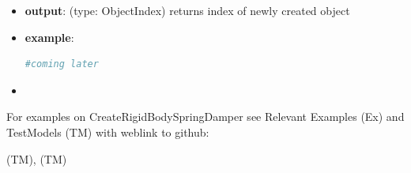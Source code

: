 \begin{itemize}[leftmargin=0.7cm]
\begin{itemize}[leftmargin=1.2cm]
\item[]{\it springForceTorqueUserFunction}: a user function springForceTorqueUserFunction(mbs, t, itemNumber, displacement, rotation, velocity, angularVelocity, stiffness, damping, rotJ0, rotJ1, offset)->[float,float,float, float,float,float] ; this function replaces the internal connector force / torque computation
\item[]{\it postNewtonStepUserFunction}: a special user function postNewtonStepUserFunction(mbs, t, Index itemIndex, dataCoordinates, displacement, rotation, velocity, angularVelocity, stiffness, damping, rotJ0, rotJ1, offset)->[PNerror, recommendedStepSize, data[0], data[1], ...] ; for details, see RigidBodySpringDamper for full docu
\item[]{\it bodyOrNodeList}: alternative to bodyNumbers; a list of object numbers (with specific localPosition0/1) or node numbers; may alse be mixed types; to use this case, set bodyNumbers = [None,None]
\item[]{\it bodyList}: DEPRECATED
\item[]{\it show}: if True, connector visualization is drawn
\item[]{\it drawSize}: general drawing size of connector
\item[]{\it color}: color of connector
\end{itemize}
\item[--]
{\bf output}: (type: ObjectIndex) returns index of newly created object
\item[--]
{\bf example}: \vspace{-12pt}\ei\begin{lstlisting}[language=Python, xleftmargin=36pt]
  #coming later
\end{lstlisting}\vspace{-24pt}\bi\item[]\vspace{-24pt}\vspace{12pt}\end{itemize}
%

%
\noindent For examples on CreateRigidBodySpringDamper see Relevant Examples (Ex) and TestModels (TM) with weblink to github:
\bi
 \item \footnotesize {} (TM), 
 (TM)
\ei

